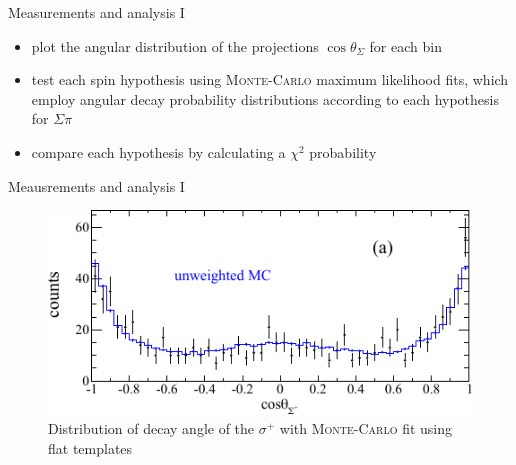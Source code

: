 \documentclass[11pt,aspectratio=1610,dvipsnames]{beamer}
\begin{document}
\begin{frame}{Measurements and analysis I }
	\begin{minipage}{\linewidth}
	\begin{tcolorbox}[colback=black!10,colframe=gray!20!black,title=Analysis procedure] 
		\begin{itemize}
			\item plot the angular distribution of the projections  $\cos\theta_\Sigma$ for each bin
			\item test each spin hypothesis using \textsc{Monte-Carlo} maximum likelihood fits, which employ angular decay probability distributions according to each hypothesis for $\Sigma\pi$ 
			\item compare each hypothesis by calculating a $\chi^2$ probability
		\end{itemize}
	\end{tcolorbox}	

\end{minipage}
\end{frame}
\begin{frame}{Meausrements and analysis I}
	\begin{figure}
		\centering
		\includegraphics[width=\linewidth]{spin_half}
		\caption{Distribution of decay angle of the $\sigma^+$ with \textsc{Monte-Carlo} fit using flat templates \citet{spinparity}}
	\end{figure}
\end{frame}
\end{document}

